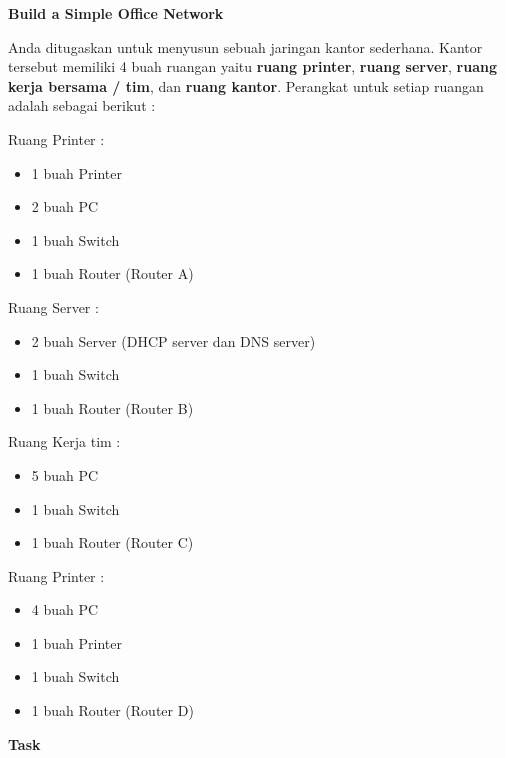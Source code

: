 \documentclass{article}
\begin{document}
    \begin{center}
        \textbf{Build a Simple Office Network}
    \end{center}
	
	\begin{flushleft}
		 Anda ditugaskan untuk menyusun sebuah jaringan kantor sederhana. Kantor tersebut memiliki 4 buah ruangan yaitu \textbf{ruang printer}, \textbf{ruang server}, \textbf{ruang kerja bersama / tim}, dan \textbf{ruang kantor}. Perangkat untuk setiap ruangan adalah sebagai berikut :
	\end{flushleft}
   
    
	\begin{flushleft}
		Ruang Printer :
		\begin{itemize}
			\item 1 buah Printer
			\item 2 buah PC
			\item 1 buah Switch
			\item 1 buah Router (Router A)
		\end{itemize}
		
		Ruang Server :
		\begin{itemize}
			\item 2 buah Server (DHCP server dan DNS server)
			\item 1 buah Switch
			\item 1 buah Router (Router B)
		\end{itemize}
		
		Ruang Kerja tim :
		\begin{itemize}
			\item 5 buah PC
			\item 1 buah Switch
			\item 1 buah Router (Router C)
		\end{itemize}
		
		Ruang Printer :
		\begin{itemize}
			\item 4 buah PC
			\item 1 buah Printer
			\item 1 buah Switch
			\item 1 buah Router (Router D)
		\end{itemize} 
	\end{flushleft}
	
	\newpage

	\begin{center}
        \textbf{Task}
    \end{center}
    
\end{document}
